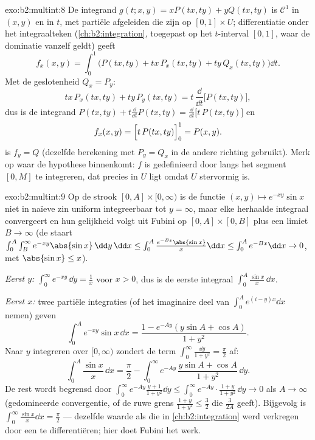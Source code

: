 \begin{solution}{exo:b2:multint:8}
De integrand $g(t; x, y) = xP(tx, ty) + yQ(tx, ty)$ is
$\mathcal{C}^1$ in $(x, y)$ en  in $t$, met partiële
afgeleiden die  zijn op $[0,1] \times U$; differentiatie
onder het integraalteken (\cref{ch:b2:integration}, toegepast op
het  $t$-interval $[0,1]$, waar de dominatie vanzelf geldt)
geeft
\[
f_x(x, y)
= \int_0^1 \bigl(P(tx, ty) + tx\,P_x(tx, ty)
+ ty\,Q_x(tx, ty)\bigr)\dd t .
\]
Met de geslotenheid $Q_x = P_y$:
\[
tx\,P_x(tx, ty) + ty\,P_y(tx, ty)
= t\,\frac{\dd}{\dd t}\bigl[P(tx, ty)\bigr] ,
\]
dus is de integrand $P(tx, ty) + t\frac{\dd}{\dd t}P(tx, ty) =
\frac{\dd}{\dd t}\bigl[t\,P(tx, ty)\bigr]$ en
\[
f_x(x, y) = \Bigl[t\,P(tx, ty)\Bigr]_0^1 = P(x, y) .
\]
 is $f_y = Q$ (dezelfde berekening met $P_y = Q_x$ in de
andere richting gebruikt). Merk op waar de hypothese binnenkomt:
$f$ is gedefinieerd door langs het segment $[0, M]$ te integreren,
dat precies in $U$ ligt omdat $U$ stervormig is.
\end{solution}

\begin{solution}{exo:b2:multint:9}
Op de strook $[0, A] \times [0, \infty)$ is de functie $(x, y)
\mapsto e^{-xy}\sin x$ niet in naïeve zin uniform 
integreerbaar tot $y = \infty$, maar elke herhaalde integraal
convergeert en hun gelijkheid volgt uit Fubini op $[0, A] \times
[0, B]$ plus een limiet $B \to \infty$ (de staart
$\int_0^A\int_B^\infty e^{-xy}\abs{\sin x}\,\dd y\,\dd x \leq
\int_0^A \frac{e^{-Bx}\abs{\sin x}}{x}\dd x \leq \int_0^A e^{-Bx}
\dd x\to 0$, met $\abs{\sin x} \leq x$).

\emph{Eerst $y$:} $\int_0^\infty e^{-xy}\,\dd y = \frac1x$ voor $x
> 0$, dus is de eerste integraal $\int_0^A \frac{\sin x}{x}\,\dd
x$.

\emph{Eerst $x$:} twee partiële integraties (of het imaginaire deel
van $\int_0^A e^{(i - y)x}\dd x$ nemen) geven
\[
\int_0^A e^{-xy}\sin x\,\dd x
= \frac{1 - e^{-Ay}(y\sin A + \cos A)}{1 + y^2} .
\]
Naar $y$ integreren over $[0, \infty)$ zondert de term
$\int_0^\infty \frac{\dd y}{1 + y^2} = \frac\pi2$ af:
\[
\int_0^A \frac{\sin x}{x}\,\dd x
= \frac{\pi}{2}
- \int_0^\infty e^{-Ay}\,\frac{y\sin A + \cos A}{1 + y^2}\,\dd y .
\]
De rest wordt begrensd door $\int_0^\infty e^{-Ay}\frac{y + 1}{1 +
y^2}\dd y \leq \int_0^\infty e^{-Ay}\cdot\frac{1+y}{1+y^2} \,\dd y
\to 0$ als $A \to \infty$ (gedomineerde convergentie, of de ruwe
grens $\frac{1 + y}{1 + y^2} \leq \frac32$ die $\frac{3}{2A}$
geeft). Bijgevolg is $\int_0^\infty\frac{\sin x}{x}\dd x =
\frac\pi2$ --- dezelfde waarde als die in
\cref{ch:b2:integration} werd verkregen door een
 te differentiëren; hier doet Fubini het werk.
\end{solution}

